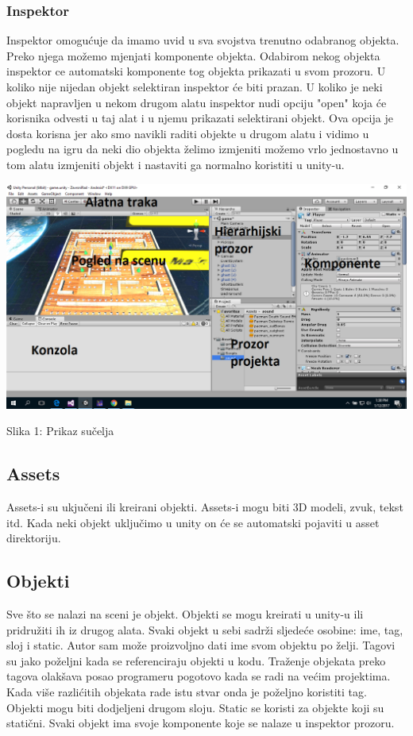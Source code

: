 \subsubsection{Inspektor}
Inspektor omogućuje da imamo uvid u sva svojstva trenutno odabranog objekta. Preko njega možemo mjenjati komponente objekta. Odabirom nekog objekta inspektor ce automatski komponente tog objekta prikazati u svom prozoru. U koliko nije nijedan objekt selektiran inspektor će biti prazan. U koliko je neki objekt napravljen u nekom drugom alatu inspektor nudi opciju "open" koja će korisnika odvesti u taj alat i u njemu prikazati selektirani objekt. Ova opcija je dosta korisna jer ako smo navikli raditi objekte u drugom alatu i vidimo u pogledu na igru da neki dio objekta želimo izmjeniti možemo vrlo jednostavno u tom alatu izmjeniti objekt i nastaviti ga normalno koristiti u unity-u.


\begin{center}
\includegraphics[scale=0.35]{interface.png}

Slika 1: Prikaz sučelja
\end{center}

\subsection{Assets}
Assets-i su ukjučeni ili kreirani objekti. Assets-i mogu biti 3D modeli, zvuk, tekst itd. Kada neki objekt uključimo u unity on će se automatski pojaviti u asset direktoriju.


\subsection{Objekti}
Sve što se nalazi na sceni je objekt. Objekti se mogu kreirati u unity-u ili pridružiti ih iz drugog alata. Svaki objekt u sebi sadrži sljedeće osobine: ime, tag, sloj i static. Autor sam može proizvoljno dati ime svom objektu po želji. Tagovi su jako poželjni kada se referenciraju objekti u kodu. Traženje objekata preko tagova olakšava posao programeru pogotovo kada se radi na većim projektima. Kada više razlićitih objekata rade istu stvar onda je poželjno koristiti tag. Objekti mogu biti dodjeljeni drugom sloju. Static se koristi za objekte koji su statični. Svaki objekt ima svoje komponente koje se nalaze u inspektor prozoru.


